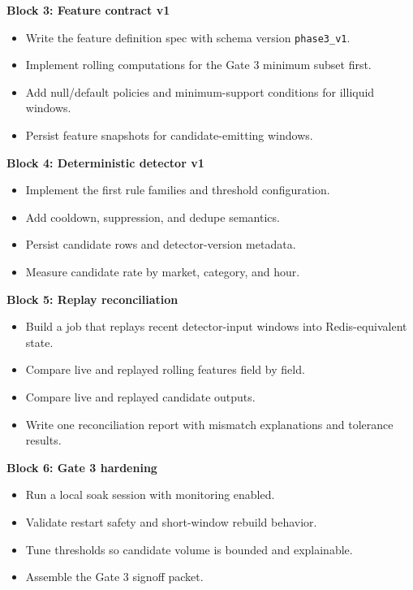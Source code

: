 \documentclass{article}
\begin{document}
\textbf{Block 3: Feature contract v1}
\begin{itemize}
\item Write the feature definition spec with schema version \texttt{phase3\_v1}.
\item Implement rolling computations for the Gate 3 minimum subset first.
\item Add null/default policies and minimum-support conditions for illiquid windows.
\item Persist feature snapshots for candidate-emitting windows.
\end{itemize}

\textbf{Block 4: Deterministic detector v1}
\begin{itemize}
\item Implement the first rule families and threshold configuration.
\item Add cooldown, suppression, and dedupe semantics.
\item Persist candidate rows and detector-version metadata.
\item Measure candidate rate by market, category, and hour.
\end{itemize}

\textbf{Block 5: Replay reconciliation}
\begin{itemize}
\item Build a job that replays recent detector-input windows into Redis-equivalent state.
\item Compare live and replayed rolling features field by field.
\item Compare live and replayed candidate outputs.
\item Write one reconciliation report with mismatch explanations and tolerance results.
\end{itemize}

\textbf{Block 6: Gate 3 hardening}
\begin{itemize}
\item Run a local soak session with monitoring enabled.
\item Validate restart safety and short-window rebuild behavior.
\item Tune thresholds so candidate volume is bounded and explainable.
\item Assemble the Gate 3 signoff packet.
\end{itemize}
\end{document}
